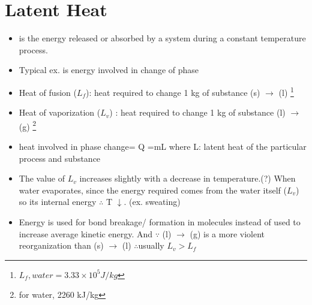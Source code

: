 \documentclass[12 pt , twoside, letterpaper] {article}
\begin{document}
\section{Latent Heat}
	\begin{itemize}
		\item is the energy released or absorbed by a system during a constant temperature process. 
		\item Typical ex. is energy involved in change of phase 
		\item Heat of fusion ($L_f$): heat required to change 1 kg of substance (s) $\rightarrow$ (l)
			\footnote{$L_f, {water} = 3.33 \times 10 ^5 J/kg$}
		\item Heat of vaporization ($L_v$) : heat required to change 1 kg of substance (l) $\rightarrow$ (g)
			\footnote{for water, 2260 kJ/kg}
		\item heat involved in phase change= Q =mL where L: latent heat of the particular process and substance
		\item The value of $L_v$ increases slightly with a decrease in temperature.(?)
	When water evaporates, since the energy required comes from the water itself ($L_v$) so its internal energy $\therefore$ T $\downarrow$. (ex. sweating)
		\item Energy is used for bond breakage/ formation in molecules instead of used to increase average kinetic energy. And $\because$  (l) $\rightarrow$ (g) is a more violent reorganization than (s) $\rightarrow$ (l) $\therefore$usually $L_v >L_f$
	\end{itemize}		
\end{document}
